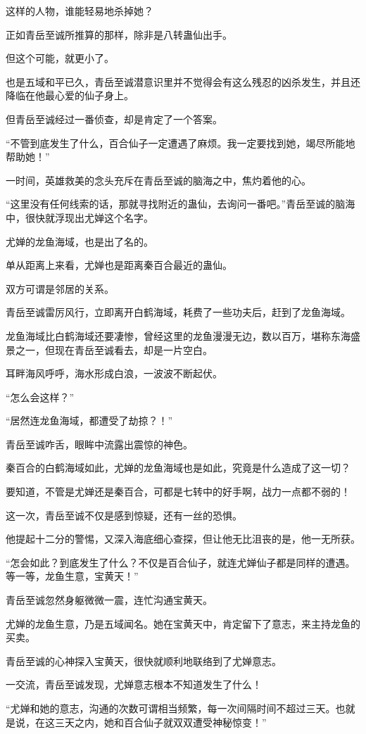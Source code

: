 \begin{this_body}
这样的人物，谁能轻易地杀掉她？

正如青岳至诚所推算的那样，除非是八转蛊仙出手。

但这个可能，就更小了。

也是五域和平已久，青岳至诚潜意识里并不觉得会有这么残忍的凶杀发生，并且还降临在他最心爱的仙子身上。

但青岳至诚经过一番侦查，却是肯定了一个答案。

“不管到底发生了什么，百合仙子一定遭遇了麻烦。我一定要找到她，竭尽所能地帮助她！”

一时间，英雄救美的念头充斥在青岳至诚的脑海之中，焦灼着他的心。

“这里没有任何线索的话，那就寻找附近的蛊仙，去询问一番吧。”青岳至诚的脑海中，很快就浮现出尤婵这个名字。

尤婵的龙鱼海域，也是出了名的。

单从距离上来看，尤婵也是距离秦百合最近的蛊仙。

双方可谓是邻居的关系。

青岳至诚雷厉风行，立即离开白鹤海域，耗费了一些功夫后，赶到了龙鱼海域。

龙鱼海域比白鹤海域还要凄惨，曾经这里的龙鱼漫漫无边，数以百万，堪称东海盛景之一，但现在青岳至诚看去，却是一片空白。

耳畔海风呼呼，海水形成白浪，一波波不断起伏。

“怎么会这样？”

“居然连龙鱼海域，都遭受了劫掠？！”

青岳至诚咋舌，眼眸中流露出震惊的神色。

秦百合的白鹤海域如此，尤婵的龙鱼海域也是如此，究竟是什么造成了这一切？

要知道，不管是尤婵还是秦百合，可都是七转中的好手啊，战力一点都不弱的！

这一次，青岳至诚不仅是感到惊疑，还有一丝的恐惧。

他提起十二分的警惕，又深入海底细心查探，但让他无比沮丧的是，他一无所获。

“怎会如此？到底发生了什么？不仅是百合仙子，就连尤婵仙子都是同样的遭遇。等一等，龙鱼生意，宝黄天！”

青岳至诚忽然身躯微微一震，连忙沟通宝黄天。

尤婵的龙鱼生意，乃是五域闻名。她在宝黄天中，肯定留下了意志，来主持龙鱼的买卖。

青岳至诚的心神探入宝黄天，很快就顺利地联络到了尤婵意志。

一交流，青岳至诚发现，尤婵意志根本不知道发生了什么！

“尤婵和她的意志，沟通的次数可谓相当频繁，每一次间隔时间不超过三天。也就是说，在这三天之内，她和百合仙子就双双遭受神秘惊变！”


\end{this_body}
